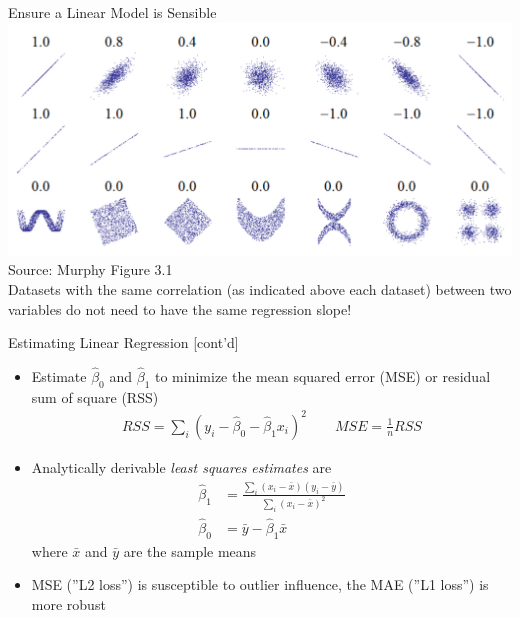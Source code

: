 \documentclass[ignorenonframetext,xcolor=x11names]{beamer}
\begin{document}
\begin{frame}{Ensure a Linear Model is Sensible}
\centering
\includegraphics[width=.9\textwidth]{screen2.png} \\

\scriptsize Source: Murphy Figure 3.1 \\ \vspace{3mm}
\normalsize
Datasets with the same correlation (as indicated above each dataset) between two variables do not need to have the same regression slope!
\end{frame}


\begin{frame}{Estimating Linear Regression \small [cont'd]}
\begin{itemize}
  \item Estimate $\hat{\beta}_0$ and $\hat{\beta}_1$ to minimize the mean squared error (MSE) or residual sum of square (RSS)
\begin{align*}
RSS = \sum_i \left( y_i - \hat{\beta}_0 - \hat{\beta}_1 x_i \right)^2 \quad \quad MSE = \frac{1}{n} RSS
\end{align*}
  \item Analytically derivable \emph{least squares estimates} are
\begin{align*}
\hat{\beta}_1 &= \frac{\sum_i (x_i - \bar{x})(y_i - \bar{y})} {\sum_i (x_i - \bar{x})^2} \\
\hat{\beta}_0 &= \bar{y} - \hat{\beta}_1 \bar{x}
\end{align*}
where $\bar{x}$ and $\bar{y}$ are the sample means
\item MSE (''L2 loss'') is susceptible to outlier influence, the MAE (''L1 loss'') is more robust
\end{itemize}
\end{frame}
\end{document}
